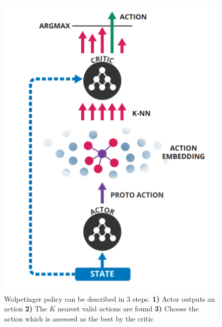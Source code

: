 \begin{figure}[!h]
\centering
\includegraphics[scale=0.35]{fig/wolpetinger-policy.png}
\caption[Wolpetinger policy illustration] {Wolpetinger policy can be described in 3 steps. \textbf{1)} Actor outputs an action \textbf{2)} The $K$ nearest valid actions are found \textbf{3)} Choose the action which is assessed as the best by the critic}
\label{fig:wolpetinger}
\end{figure}

